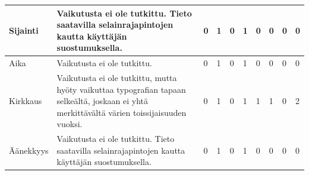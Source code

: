 \documentclass[finnish, 12pt, a4paper, elec, utf8, a-1b]{aaltothesis}
\begin{document}
{\begin{longtable}{p{2.5cm}|p{6cm}|p{0.5cm}p{0.5cm}p{0.5cm}|p{0.5cm}|p{0.5cm}p{0.5cm}p{0.5cm}|p{0.5cm}|}
    \midrule
    Sijainti                               & Vaikutusta ei ole tutkittu. Tieto saatavilla selainrajapintojen kautta käyttäjän suostumuksella.                                                                                                                                                                                                                     & 0                                          & 1                                   & 0                                      & 1                            & 0                                               & 0                                         & 0                                         & 0                            \\
    \midrule
    Aika                                   & Vaikutusta ei ole tutkittu.                                                                                                                                                                                                                                                                                          & 0                                          & 1                                   & 0                                      & 1                            & 0                                               & 0                                         & 0                                         & 0                            \\
    \midrule
    Kirkkaus                               & Vaikutusta ei ole tutkittu, mutta hyöty vaikuttaa typografian tapaan selkeältä, joskaan ei yhtä merkittävältä värien toissijaisuuden vuoksi.                                                                                                                                                                         & 0                                          & 1                                   & 0                                      & 1                            & 1                                               & 1                                         & 0                                         & 2                            \\
    \midrule
    Äänekkyys                              & Vaikutusta ei ole tutkittu. Tieto saatavilla selainrajapintojen kautta käyttäjän suostumuksella.                                                                                                                                                                                                                     & 0                                          & 1                                   & 0                                      & 1                            & 0                                               & 0                                         & 0                                         & 0                            \\

\end{longtable}}
\end{document}

